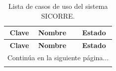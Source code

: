 \begin{center}
	\begin{longtable}{|c|p{}|c|}
		\caption{Lista de casos de uso del sistema SICORRE.}
		\label{tab:casosDeUso} \\
		
		\hline
		\textbf{Clave} & \textbf{Nombre} & \textbf{Estado} \\
		\hline
		\endfirsthead
		
		\hline
		\textbf{Clave} & \textbf{Nombre} & \textbf{Estado} \\
		\hline
		\endhead
		
		\hline
		\multicolumn{3}{|r|}{\small Continúa en la siguiente página...} \\
		\hline
		\endfoot
		
		\hline
		\endlastfoot
		

\end{longtable}
\end{center}

